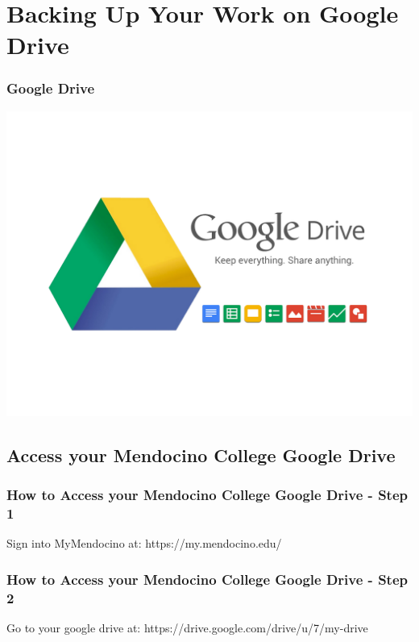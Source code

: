 \documentclass{beamer}
\begin{document}
	\section{Backing Up Your Work on Google Drive}	
		\begin{frame}
		\frametitle{Google Drive}
		\begin{center}
			\includegraphics[width = 1.0\textwidth]{images/Download-Google-Drive-for-Windows.png}
		\end{center}
	\end{frame}
	
	\subsection{Access your Mendocino College Google Drive}
	\begin{frame}
		\frametitle{How to Access your Mendocino College Google Drive - Step 1}
	\begin{outline}
	\1 Sign into MyMendocino at:
	\1 https://my.mendocino.edu/
\end{outline}
	\end{frame}

	\begin{frame}
	\frametitle{How to Access your Mendocino College Google Drive - Step 2}
	\begin{outline}
	\1 Go to your google drive at:
	\1 https://drive.google.com/drive/u/7/my-drive
\end{outline}
\end{frame}
\end{document}
